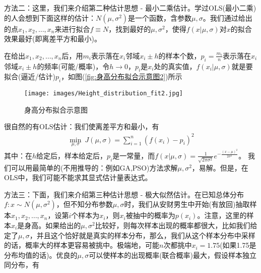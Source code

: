     \par
    方法二：这里，我们来介绍第二种估计思想 - 最小二乘估计。学过OLS(最小二乘)的人会想到下面这样的估计：$N(\mu,\sigma^2)$是一个函数，含参数$\mu,\sigma$。我们通过给出的点$x_1,x_2,\dots,x_n$来进行拟合$f\equiv N$，找到最好的$\mu,\sigma^2$，使得$f(x|\mu,\sigma)$对$x$的拟合效果最好(即离差平方和最小)。
    \par
    在给出$x_1,x_2,\dots,x_n$后，用$m_i$表示落在$x_i$邻域$x_i\pm h$的样本个数，$p_i = \frac{m_i}{n}$表示落在$x_i$邻域$x_i\pm h$的频率(可能/概率)，令$h\rightarrow 0$，$p_i$是$x_i$处的真实值，$f(x_i|\mu,\sigma)$就是要拟合(逼近/估计)$p_i$，如图(\ref{fig:身高分布拟合示意图2})所示
            \begin{figure}[H]
            \centering
            \texttt{[image: images/Height\_distribution\_fit2.jpg]}
            \caption{身高分布拟合示意图}
            \label{fig:身高分布拟合示意图}
            \end{figure}
    很自然的有OLS估计：我们使离差平方和最小，有
    \begin{align*}
    \min_{\mu,\sigma} \ J(\mu,\sigma)= \sum_{i = 1}^n \left( f(x_i) - p_i \right) ^2
    \end{align*}
    其中：在$h$给定后，样本给定后，$p_i$是一常量，而$f(x|\mu,\sigma) = \frac{1}{\sqrt{2\pi \sigma^2}} e^{- \frac{(x-\mu)^2}{2\sigma^2}  }$。
    我们可以用最简单的(不用推导的：例如GA,PSO)方法求解$\mu,\sigma^2$，易解。但是，在OLS中，我们可能不能求其显式估计量表达式。
    \par
    方法三：下面，我们来介绍第三种估计思想 - 极大似然估计。在已知总体分布$f:x\sim N(\mu,\sigma^2)$，但不知分布参数$\mu,\sigma$时，我们从安财男生中开始(有放回)抽取样本$x_1,x_2,\dots,x_n$，设第$i$个样本为$x_i$，则$x_i$被抽中的概率为$p(x_i)$。注意，这里的样本$x_i$是身高。如果给出的$\mu,\sigma^2$比较好，则每次样本出现的概率都很大，比如我们给定了$\mu,\sigma$，并且这个恰好就是真实的样本分布，那么，我们从这个样本分布中采样的话，概率大的样本更容易被挑中。极端地，可能$n$次都挑中$x_i = 1.75$(如果1.75是分布均值的话)。优良的$\mu,\sigma$可以使样本的出现概率(联合概率)最大，假设样本独立同分布，有
